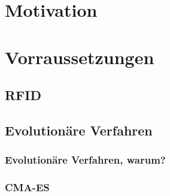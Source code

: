 \section[Motivation]{Motivation}
\lipsum[1-2]

\section{Vorraussetzungen}
\lipsum[1-2]

\subsection{RFID}
\lipsum[1-2]

\subsection{Evolutionäre Verfahren}
\lipsum[1-2]

\subsubsection{Evolutionäre Verfahren, warum?}
\lipsum[1]

\subsubsection{CMA-ES}
\lipsum[1]